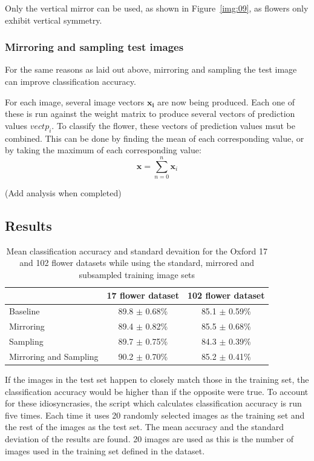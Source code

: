 \documentclass[11pt, a4paper]{report}
\newcommand{\vect}[1]{\boldsymbol{#1}}
\begin{document}
Only the vertical mirror can be used, as shown in Figure~\ref{img:09}, as flowers only exhibit vertical symmetry. 


\subsubsection{Mirroring and sampling test images}

For the same reasons as laid out above, mirroring and sampling the test image can improve classification accuracy.

For each image, several image vectors $\vect{x_{i}}$ are now being produced. Each one of these is run against the weight matrix to produce several vectors of prediction values $vect{p_{i}}$. To classify the flower, these vectors of prediction values msut be combined. This can be done by finding the mean of each corresponding value, or by taking the maximum of each corresponding value:
$$
\vect{x} = \sum_{n = 0}^{n} \vect{x}_{i}
$$

(Add analysis when completed)

\subsection{Results}

\begin{table}[h]
\centering 
\renewcommand{\arraystretch}{1.3}
\begin{tabular}{l|cc}
  & {\bf 17 flower dataset} & {\bf 102 flower dataset} \\
  \hline
  Baseline & 89.8 $\pm$ 0.68\% & 85.1 $\pm$ 0.59\% \\
  Mirroring & 89.4 $\pm$ 0.82\% & 85.5 $\pm$ 0.68\% \\
  Sampling & 89.7 $\pm$ 0.75\% & 84.3 $\pm$ 0.39\% \\
  Mirroring and Sampling & 90.2 $\pm$ 0.70\% & 85.2 $\pm$ 0.41\% 
\end{tabular}
\renewcommand{\arraystretch}{1}
\caption{Mean classification accuracy and standard devaition for the Oxford 17 and 102 flower datasets while using the standard, mirrored and subsampled training image sets}
\label{table:accuracy}
\end{table}

If the images in the test set happen to closely match those in the training set, the classification accuracy would be higher than if the opposite were true. To account for these idiosyncrasies, the script which calculates classification accuracy is run five times. Each time it uses 20 randomly selected images as the training set and the rest of the images as the test set. The mean accuracy and the standard deviation of the results are found. 20 images are used as this is the number of images used in the training set defined in the dataset. 
\end{document}
